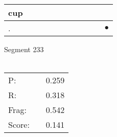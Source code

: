 \documentclass[landscape]{article}
\newcommand{\ssp}{\hspace{2pt}}
\newcommand{\mex}{\cellcolor{g}$\bullet$}
\begin{document}
\begin{tabular}{|l|p{10pt}|p{10pt}|p{10pt}|p{10pt}|p{10pt}|p{10pt}|p{10pt}|p{10pt}|p{10pt}|p{10pt}|}
\hline
\ssp cup \ssp&\hspace{2pt}&\hspace{2pt}&\hspace{2pt}&\hspace{2pt}&\hspace{2pt}&\hspace{2pt}&\hspace{2pt}&\hspace{2pt}&\hspace{2pt}&\hspace{2pt}\\
\hline
\ssp \cellcolor{ref9}. \ssp&\hspace{2pt}&\hspace{2pt}&\hspace{2pt}&\hspace{2pt}&\hspace{2pt}&\hspace{2pt}&\hspace{2pt}&\hspace{2pt}&\hspace{2pt}&\hspace{2pt}\mex\\
\hline
\end{tabular}

\vspace{6pt}
\noindent Segment 233\\\\
\noindent\begin{tabular}{lm{12pt}r}
\hline
P:&&0.259\\
R:&&0.318\\
Frag:&&0.542\\
Score:&&0.141\\
\end{tabular}

\newpage
\end{document}

